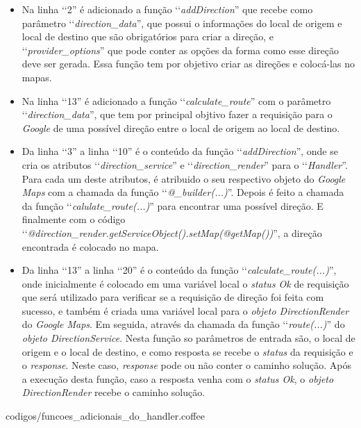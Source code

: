 \begin{itemize}

 \item Na linha ‘‘2'' é adicionado a função ‘‘\emph{addDirection}'' que recebe como parâmetro 
 ‘‘\emph{direction\_data}'', que possui o informações do local de origem e local de destino que são 
 obrigatórios para criar a direção, e ‘‘\emph{provider\_options}'' que pode conter as opções da forma
 como esse direção deve ser gerada. Essa função tem por objetivo criar as direções e colocá-las no mapas.
 
 \item Na linha ‘‘13'' é adicionado a função ‘‘\emph{calculate\_route}'' com o parâmetro 
 ‘‘\emph{direction\_data}'', que tem por principal objtivo fazer a requisição para o \emph{Google } de uma 
 possível direção entre o local de origem ao local de destino.
 
 \item Da linha ‘‘3'' a linha ‘‘10'' é o conteúdo da função ‘‘\emph{addDirection}'', onde se cria os
 atributos ‘‘\emph{direction\_service}'' e ‘‘\emph{direction\_render}'' para o ‘‘\emph{Handler}''. Para
 cada um deste atributos, é atribuido o seu respectivo objeto do \emph{Google Maps} com a chamada da função 
 ‘‘\emph{@\_builder(...)}''. Depois é feito a chamada da função ‘‘\emph{calulate\_route(...)}''
 para encontrar uma possível direção. E finalmente com o código 
 ‘‘\emph{@direction\_render.getServiceObject().setMap(@getMap())}'', a direção encontrada é colocado 
 no mapa.
 
 \item Da linha ‘‘13'' a linha ‘‘20'' é o conteúdo da função ‘‘\emph{calculate\_route(...)}'', onde 
 inicialmente é colocado em uma variável local o \emph{status Ok} de requisição que será utilizado
 para verificar se a requisição de direção foi feita com sucesso, e também é criada uma variável local 
 para o \emph{objeto DirectionRender} do \emph{Google Maps}. Em seguida, através da chamada da função 
 ‘‘\emph{route(...)}'' do \emph{objeto DirectionService}. Nesta função so parâmetros de entrada são,
 o local de origem e o local de destino, e como resposta se recebe o \emph{status} da requisição
 e o \emph{response}. Neste caso, \emph{response} pode ou não conter o caminho solução. Após a execução
 desta função, caso a resposta venha com o \emph{status Ok}, o \emph{objeto DirectionRender} recebe o
 caminho solução.
 
\end{itemize}


{codigos/funcoes_adicionais_do_handler.coffee}
